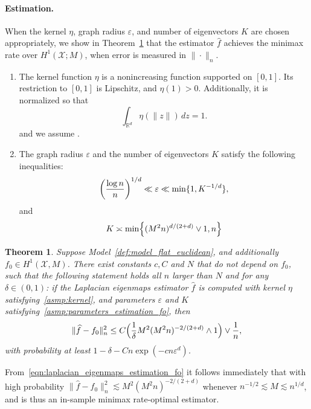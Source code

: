 \documentclass{article}
\newcommand{\Reals}{\mathbb{R}}
\newcommand{\1}{\mathbf{1}}
\newcommand{\Rd}{\Reals^d}
\newcommand{\mc}[1]{\mathcal{#1}}
\newcommand{\wh}[1]{\widehat{#1}}
\theoremstyle{alden}
\theoremstyle{aldenthm}
\newtheorem{theorem}{Theorem}
\theoremstyle{definition}
\theoremstyle{remark}
\begin{document}
\paragraph{Estimation.} When the kernel $\eta$, graph radius $\varepsilon$, and number of eigenvectors $K$ are chosen appropriately, we show in Theorem~\ref{thm:laplacian_eigenmaps_estimation_fo} that the estimator $\wh{f}$ achieves the minimax rate over $H^1(\mc{X};M)$, when error is measured in $\|\cdot\|_{n}$.
\begin{enumerate}[label=(A\arabic*)]
	\setcounter{enumi}{0}
	\item
	\label{asmp:kernel_flat_euclidean}
	The kernel function $\eta$ is a nonincreasing function supported on $[0,1]$. Its restriction to $[0,1]$ is Lipschitz, and $\eta(1) > 0$. Additionally, it is normalized so that
	\begin{equation*}
	\int_{\Rd} \eta(\|z\|) \,dz = 1.
	\end{equation*}
	and we assume \smash{$\int_{\Rd} \|x\|^2 \eta(\|x\|) \,dx < \infty$}.
	\item 
	\label{asmp:parameters_estimation_fo} 
	The graph radius $\varepsilon$ and the number of eigenvectors $K$ satisfy the following inequalities:
	\begin{equation}\\
	\label{eqn:radius_fo} 
	\biggl(\frac{\log n}{n}\biggr)^{1/d} \ll \varepsilon \ll \min\{1,K^{-1/d}\},
	\end{equation}
	and 
	\begin{equation}
	\label{eqn:eigenvector_estimation_fo} 
	K \asymp \min\Bigl\{(M^2n)^{d/(2 + d)} \vee 1, n\Bigr\}
	\end{equation}
\end{enumerate}
\begin{theorem}
	\label{thm:laplacian_eigenmaps_estimation_fo}
	Suppose Model~\ref{def:model_flat_euclidean}, and additionally $f_0 \in H^1(\mc{X},M)$. There exist constants $c,C$ and $N$ that do not depend on $f_0$, such that the following statement holds all $n$ larger than $N$ and for any $\delta \in (0,1)$: if the Laplacian eigenmaps estimator $\wh{f}$ is computed with kernel $\eta$ satisfying~\ref{asmp:kernel}, and parameters $\varepsilon$ and $K$ satisfying~\ref{asmp:parameters_estimation_fo}, then
	\begin{equation}
	\label{eqn:laplacian_eigenmaps_estimation_fo}
	\|\wh{f} - f_0\|_n^2 \leq C\Bigl(\frac{1}{\delta}M^2(M^2n)^{-2/(2 + d)} \wedge 1\Bigr) \vee \frac{1}{n},
	\end{equation}
	with probability at least $1 - \delta - Cn\exp(-cn\varepsilon^d)$.
\end{theorem}
From~\eqref{eqn:laplacian_eigenmaps_estimation_fo} it follows immediately that with high probability $\|\wh{f} - f_0\|_n^2 \lesssim M^2(M^2n)^{-2/(2 + d)}$ whenever $n^{-1/2} \lesssim M \lesssim n^{1/d}$, and is thus an in-sample minimax rate-optimal estimator.
\end{document}
